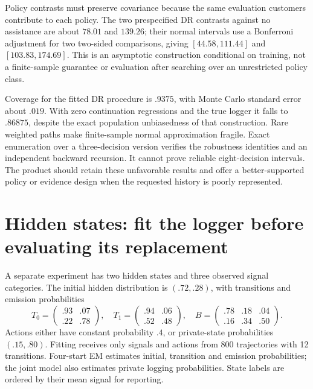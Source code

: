 Policy contrasts must preserve covariance because the same evaluation
customers contribute to each policy. The two prespecified DR contrasts
against no assistance are about $78.01$ and $139.26$; their normal
intervals use a Bonferroni adjustment for two two-sided comparisons,
giving $[44.58,111.44]$ and $[103.83,174.69]$. This is an asymptotic
construction conditional on training, not a finite-sample guarantee or
evaluation after searching over an unrestricted policy class.

\begin{table}[htbp]\centering\small

\caption{160 repeated synthetic experiments, each with 600 training and
2,000 evaluation trajectories. Bias identities do not guarantee normal
interval accuracy at this sample size.}
\label{r3:collections-coverage}
\end{table}

Coverage for the fitted DR procedure is $.9375$, with Monte Carlo
standard error about $.019$. With zero continuation regressions and
the true logger it falls to $.86875$, despite the exact population
unbiasedness of that construction. Rare weighted paths make finite-sample
normal approximation fragile. Exact enumeration over a three-decision
version verifies the robustness identities and an independent backward
recursion. It cannot prove reliable eight-decision intervals.
The product should retain these unfavorable results and offer a
better-supported policy or evidence design when the requested history
is poorly represented.

\section{Hidden states: fit the logger before evaluating its replacement}
\label{r3:latent-study}

A separate experiment has two hidden states and three observed signal
categories. The initial hidden distribution is $(.72,.28)$, with
transitions and emission probabilities
\[
 T_0=\begin{pmatrix}.93&.07\\.22&.78\end{pmatrix},\quad
 T_1=\begin{pmatrix}.94&.06\\.52&.48\end{pmatrix},\quad
 B=\begin{pmatrix}.78&.18&.04\\.16&.34&.50\end{pmatrix}.
\]
Actions either have constant probability $.4$, or private-state
probabilities $(.15,.80)$. Fitting receives only signals and actions
from 800 trajectories with 12 transitions. Four-start EM estimates
initial, transition and emission probabilities; the joint model also
estimates private logging probabilities. State labels are ordered by
their mean signal for reporting.

